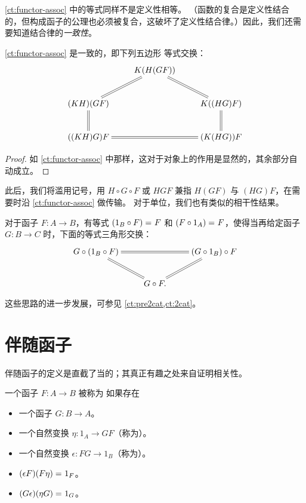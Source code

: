 \cref{ct:functor-assoc} 中的等式同样不是定义性相等。
（函数的复合是定义性结合的，但构成函子的公理也必须被复合，这破坏了定义性结合律。）因此，我们还需要知道结合律的\emph{一致性}。

\begin{lem}\label{ct:pentagon}
  \cref{ct:functor-assoc} 是一致的，即下列五边形 等式交换：
  \[ \xymatrix{ & K(H(GF)) \ar@{=}[dl] \ar@{=}[dr]\\
    (KH)(GF) \ar@{=}[d] && K((HG)F) \ar@{=}[d]\\
    ((KH)G)F && (K(HG))F \ar@{=}[ll].}
  \]
\end{lem}

\begin{proof}
  如 \cref{ct:functor-assoc} 中那样，这对于对象上的作用是显然的，其余部分自动成立。
\end{proof}

此后，我们将滥用记号，用 $H\circ G\circ F$ 或 $HGF$ 兼指 $H(GF)$ 与 $(HG)F$，在需要时沿 \cref{ct:functor-assoc} 做传输。
对于单位，我们也有类似的相干性结果。

\begin{lem}\label{ct:units}
  对于函子 $F:A\to B$，有等式 $(1_B\circ F) =_{} F$ 和 $(F\circ 1_A) =_{} F$，使得当再给定函子 $G:B\to C$ 时，下面的等式三角形交换：
  \[ \xymatrix{
    G\circ (1_B \circ F) \ar@{=}[rr] \ar@{=}[dr] &&
    (G\circ 1_B)\circ F \ar@{=}[dl] \\
    & G \circ F.}
  \]
\end{lem}

这些思路的进一步发展，可参见 \cref{ct:pre2cat,ct:2cat}。

\section{伴随函子}
\label{sec:adjunctions}

伴随函子的定义是直截了当的；其真正有趣之处来自证明相关性。

\begin{defn}\label{ct:adjoints}
  一个函子 $F:A\to B$ 被称为
  如果存在
  \begin{itemize}
  \item 一个函子 $G:B\to A$。
  \item 一个自然变换 $\eta:1_A \to GF$（称为）。
  \item 一个自然变换 $\epsilon:FG\to 1_B$（称为）。
  \item $(\epsilon F)(F\eta) =_{} 1_F$。
  \item $(G\epsilon)(\eta G) =_{} 1_G$。
  \end{itemize}
\end{defn}

